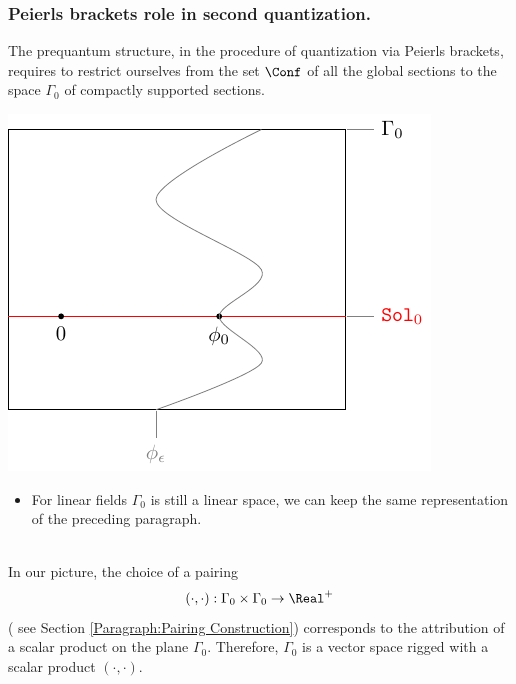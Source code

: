 \documentclass[Main]{subfiles}
\begin{document}
		
		\subsubsection{Peierls brackets role in second quantization.}
		The prequantum structure, in the procedure of quantization via Peierls brackets, requires to restrict ourselves from the set $\Conf$ of all the global sections to the space $\Gamma_0$ of compactly supported sections.

		\vspace{1mm}		
		\begin{minipage}{0.5\textwidth}
			\includegraphics[width=\textwidth]{Pictures/compsupp_GeometricPicture0}
		\end{minipage}
		\begin{minipage}{0.5\textwidth}
			\begin{itemize}
				\item  For linear fields $\Gamma_0$ is still a linear space, we can keep the same representation of the preceding paragraph.
			\end{itemize}
		\end{minipage}
		\vspace{1mm}\\					

	In our picture, the  choice of a pairing 
	\begin{displaymath}
		( \cdot , \cdot ) : \Gamma_0 \times \Gamma_0 \rightarrow \Real^+
	\end{displaymath}
	 ( see Section \ref{Paragraph:Pairing Construction}) corresponds to the attribution of a scalar product on the plane $\Gamma_0$.
	Therefore, $\Gamma_0$ is a vector space rigged with a scalar product $(\cdot , \cdot)$.\\
\end{document}

